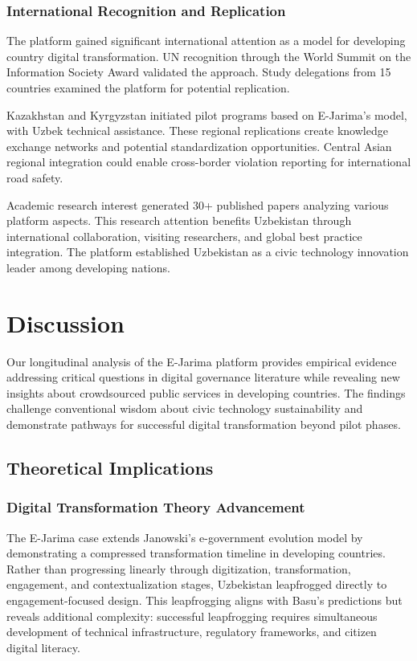 \documentclass[pdflatex,sn-mathphys-num]{sn-jnl}%
\theoremstyle{thmstyleone}%
\theoremstyle{thmstyletwo}%
\theoremstyle{thmstylethree}%
\begin{document}
\subsubsection{International Recognition and Replication}

The platform gained significant international attention as a model for developing country digital transformation. UN recognition through the World Summit on the Information Society Award validated the approach. Study delegations from 15 countries examined the platform for potential replication.

Kazakhstan and Kyrgyzstan initiated pilot programs based on E-Jarima's model, with Uzbek technical assistance. These regional replications create knowledge exchange networks and potential standardization opportunities. Central Asian regional integration could enable cross-border violation reporting for international road safety.

Academic research interest generated 30+ published papers analyzing various platform aspects. This research attention benefits Uzbekistan through international collaboration, visiting researchers, and global best practice integration. The platform established Uzbekistan as a civic technology innovation leader among developing nations.

\section{Discussion}\label{sec6}

Our longitudinal analysis of the E-Jarima platform provides empirical evidence addressing critical questions in digital governance literature while revealing new insights about crowdsourced public services in developing countries. The findings challenge conventional wisdom about civic technology sustainability and demonstrate pathways for successful digital transformation beyond pilot phases.

\subsection{Theoretical Implications}\label{subsec20}

\subsubsection{Digital Transformation Theory Advancement}

The E-Jarima case extends Janowski's \cite{janowski2015digital} e-government evolution model by demonstrating a compressed transformation timeline in developing countries. Rather than progressing linearly through digitization, transformation, engagement, and contextualization stages, Uzbekistan leapfrogged directly to engagement-focused design. This leapfrogging aligns with Basu's \cite{basu2004egovernment} predictions but reveals additional complexity: successful leapfrogging requires simultaneous development of technical infrastructure, regulatory frameworks, and citizen digital literacy.
\end{document}
